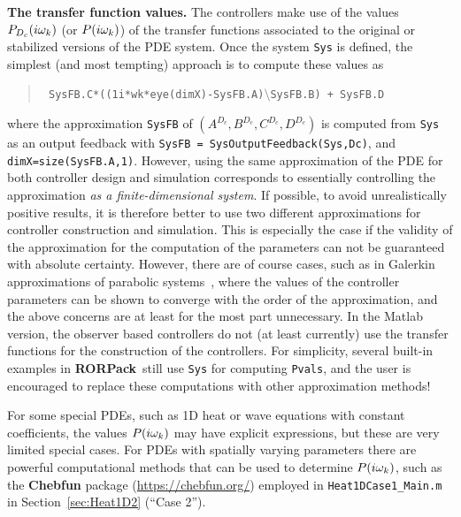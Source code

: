 \documentclass[11pt, a4paper]{amsart}
\theoremstyle{definition}
\numberwithin{equation}{section}
\newcommand{\RORname}{\textbf{RORPack}}
\begin{document}
\textbf{The transfer function values.} The controllers make use of the values  $P_{D_c}(i\omega_k)$ (or $P(i\omega_k)$)
of the transfer functions associated to the original or stabilized versions of the PDE system.
Once the system \texttt{Sys} is defined, the simplest (and most tempting) approach is to compute these values as
\begin{quotation}
\texttt{
SysFB.C*((1i*wk*eye(dimX)-SysFB.A)$\setminus$SysFB.B) + SysFB.D
}
\end{quotation}
where the approximation \texttt{SysFB} of $(A^{D_c},B^{D_c},C^{D_c},D^{D_c})$ is computed from \texttt{Sys} as an output feedback with \texttt{SysFB = SysOutputFeedback(Sys,Dc)}, and \texttt{dimX=size(SysFB.A,1)}.
However, using the same approximation of the PDE for both controller design and simulation corresponds to essentially controlling the approximation \emph{as a finite-dimensional system}. If possible, to avoid unrealistically positive results, it is therefore better to use two different approximations for controller construction and simulation. This is especially the case if the validity of the approximation for the computation of the parameters can not be guaranteed with absolute certainty. However, there are of course cases, such as in Galerkin approximations of parabolic systems~\cite{Mor94}, where the values of the controller parameters can be shown to converge with the order of the approximation, and the above concerns are at least for the most part unnecessary.
In the Matlab version, the observer based controllers do not (at least currently) use the transfer functions for the construction of the controllers.
For simplicity, several built-in examples in \RORname\ still use \texttt{Sys} for computing \texttt{Pvals}, and the user is encouraged to replace these computations with other approximation methods!

For some special PDEs, such as 1D heat or wave equations with constant coefficients, the values $P(i\omega_k)$ may have explicit expressions, but these are very limited special cases. 
 For PDEs with spatially varying parameters there are powerful computational methods that can be used to determine $P(i\omega_k)$, such as the \textbf{Chebfun} package (\href{https://chebfun.org/}{https://chebfun.org/}) employed in \texttt{Heat1DCase1\_Main.m} in Section~\ref{sec:Heat1D2} (``Case 2'').
\end{document}
